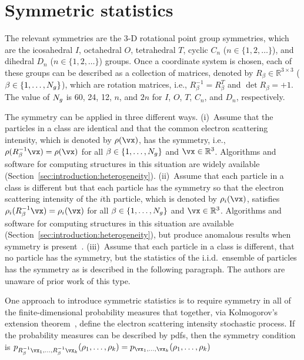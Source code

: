 \section{Symmetric statistics}
\label{sec:symmetrysymmetricstatistics}
The relevant symmetries are the 3-D rotational point group symmetries,
which are the icosahedral $I$, octahedral $O$, tetrahedral $T$, cyclic
$C_n$ ($n\in\{1,2,\dots\}$), and dihedral $D_n$ ($n\in\{1,2,\dots\}$)
groups.
Once a coordinate system is chosen, each of these groups can be described
as a collection of matrices, denoted by $R_\beta\in\mathbb{R}^{3\times 3}$
($\beta\in\{1,\dots,N_g\}$), which are rotation matrices, i.e.,
$R_\beta^{-1}=R_\beta^T$ and $\det R_\beta=+1$.
The value of $N_g$ is 60, 24, 12, $n$, and $2n$ for $I$, $O$, $T$, $C_n$,
and $D_n$, respectively.
\par
The symmetry can be applied in three different ways.
(i)~Assume that the particles in a class are identical and that the common
electron scattering intensity, which is denoted by $\rho(\vx)$, has the
symmetry,
i.e., $\rho(R_\beta^{-1}\vx)=\rho(\vx)$ for all
$\beta\in\{1,\dots,N_g\}$ and $\vx\in\mathbb{R}^3$.
Algorithms and software for computing structures in this situation are
widely available (Section~\ref{sec:introduction:heterogeneity}).
(ii)~Assume that each particle in a class is different but that each
particle has the symmetry so that the electron scattering intensity of the
$i$th particle, which is denoted by $\rho_i(\vx)$, satisfies
$\rho_i(R_\beta^{-1}\vx)=\rho_i(\vx)$ for all $\beta\in\{1,\dots,N_g\}$
and $\vx\in\mathbb{R}^3$.
Algorithms and software for computing structures in this situation are
available (Section~\ref{sec:introduction:heterogeneity}), but produce
anomalous results when symmetry is
present~\cite[p.~173]{Ludtke.MethodsEnzymology.2016}.
(iii)~Assume that each particle in a class is different, that no particle has
the symmetry, but the statistics of the i.i.d.\ ensemble of particles has
the symmetry as is described in the following paragraph.
The authors are unaware of prior work of this type.
\par
One approach to introduce symmetric statistics is to require symmetry in
all of the finite-dimensional probability measures that together, via
Kolmogorov's extension theorem~\cite[Theorem~2.1.5 p.~11]{Oksendal2003},
define the electron scattering intensity stochastic process.
If the probability measures can be described by pdfs, then the symmetry
condition is
$p_{R_\beta^{-1}\vx_1,\dots,R_\beta^{-1}\vx_k}(\rho_1,\dots,\rho_k)
=
p_{\vx_1,\dots,\vx_k}(\rho_1,\dots,\rho_k)$
